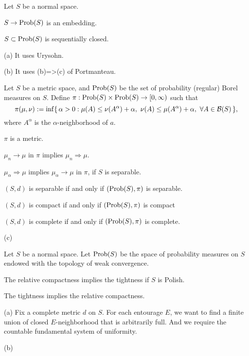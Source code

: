 \documentclass{../note}
\begin{document}
\begin{prb}
Let $S$ be a normal space.
\begin{parts}
\item $S\to\operatorname{Prob}(S)$ is an embedding.
\item $S\subset\operatorname{Prob}(S)$ is sequentially closed.
\item %
\end{parts}
\end{prb}
\begin{pf}
(a)
It uses Urysohn.

(b)
It uses (b)=>(c) of Portmanteau.
\end{pf}


\begin{prb}
Let $S$ be a metric space, and $\operatorname{Prob}(S)$ be the set of probability (regular) Borel measures on $S$.
Define $\pi:\operatorname{Prob}(S)\times\operatorname{Prob}(S)\to[0,\infty)$ such that
\[\pi(\mu,\nu):=\inf\{\,\alpha>0:\mu(A)\le\nu(A^\alpha)+\alpha,\ \nu(A)\le\mu(A^\alpha)+\alpha,\ \forall A\in\cB(S)\,\},\]
where $A^\alpha$ is the $\alpha$-neighborhood of $a$.
\begin{parts}
\item $\pi$ is a metric.
\item $\mu_n\to\mu$ in $\pi$ implies $\mu_n\Rightarrow\mu$.
\item $\mu_\alpha\Rightarrow\mu$ implies $\mu_\alpha\to\mu$ in $\pi$, if $S$ is separable.
\item $(S,d)$ is separable if and only if $(\operatorname{Prob}(S),\pi)$ is separable.
\item $(S,d)$ is compact if and only if $(\operatorname{Prob}(S),\pi)$ is compact
\item $(S,d)$ is complete if and only if $(\operatorname{Prob}(S),\pi)$ is complete.
\end{parts}
\end{prb}
\begin{pf}
(c)
\end{pf}

\begin{prb}
Let $S$ be a normal space.
Let $\operatorname{Prob}(S)$ be the space of probability measures on $S$ endowed with the topology of weak convergence.
\begin{parts}
\item The relative compactness implies the tightness if $S$ is Polish.
\item The tightness implies the relative compactness.
\end{parts}
\end{prb}
\begin{pf}
(a)
Fix a complete metric $d$ on $S$.
For each entourage $E$, we want to find a finite union of closed $E$-neighborhood that is arbitrarily full.
And we require the countable fundamental system of uniformity.

(b)
\end{pf}
\end{document}

